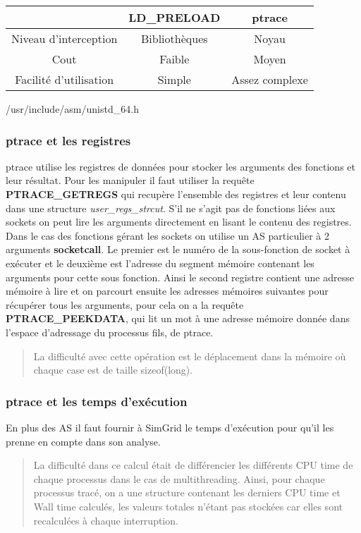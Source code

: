 \documentclass{article}
\begin{document}
\begin{tabular}{|c|c|c|}
\hline & LD\_PRELOAD & ptrace\\ \hline Niveau d'interception &
Bibliothèques & Noyau \\ \hline Cout & Faible & Moyen \\ \hline
Facilité d'utilisation & Simple & Assez complexe \\ \hline
\end{tabular}

/usr/include/asm/unistd\_64.h

\subsubsection{ptrace et les registres}
ptrace utilise les registres de données pour stocker les arguments des
fonctions et leur résultat. Pour les manipuler il faut utiliser la
requête \textbf{PTRACE\_GETREGS} qui recupère l'ensemble des registres
et leur contenu dans une structure \textit{user\_regs\_strcut}. S'il
ne s'agit pas de fonctions liées aux sockets on peut lire les
arguments directement en lisant le contenu des registres. Dans le cas
des fonctions gérant les sockets on utilise un AS particulier à 2
arguments \textbf{socketcall}. Le premier est le numéro de la
sous-fonction de socket à exécuter et le deuxième est l'adresse du
segment mémoire contenant les arguments pour cette sous
fonction. Ainsi le second registre contient une adresse mémoire à lire
et on parcourt ensuite les adresses mémoires suivantes pour récupérer
tous les arguments, pour cela on a la requête
\textbf{PTRACE\_PEEKDATA}, qui lit un mot à une adresse mémoire donnée
dans l'espace d'adressage du processus fils, de ptrace.
\begin{quotation}
La difficulté avec cette opération est le déplacement dans la mémoire
où chaque case est de taille sizeof(long).
\end{quotation}

\subsubsection{ptrace et les temps d'exécution}
En plus des AS il faut fournir à SimGrid le temps d'exécution pour
qu'il les prenne en compte dans son analyse.
\begin{quotation}
La difficulté dans ce calcul était de différencier les différents CPU
time de chaque processus dans le cas de multithreading. Ainsi, pour
chaque processus tracé, on a une structure contenant les derniers CPU
time et Wall time calculés, les valeurs totales n’étant pas stockées
car elles sont recalculées à chaque interruption.
\end{quotation}
\end{document}

